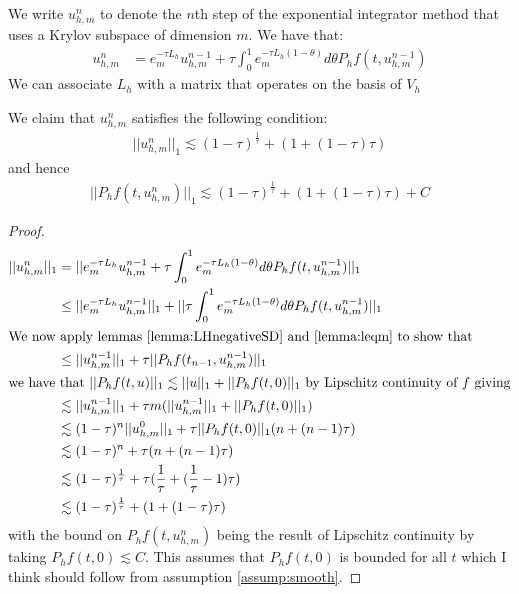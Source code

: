 \begin{definition}
    We write $u_{h,m}^n$ to denote the $n$th step of the exponential integrator method that uses a Krylov subspace of dimension $m$.
    We have that:
    \begin{align*}
        u_{h,m}^n &= e_m^{-\tau L_h} u_{h,m}^{n-1} + \tau \int^1_0e_m^{-\tau L_h(1-\theta)}d\theta P_hf(t, u_{h,m}^{n-1})
    \end{align*}
    We can associate $L_h$ with a matrix that operates on the basis of $V_h$
\end{definition}

\begin{lemma}
    We claim that $u_{h,m}^n$ satisfies the following condition:
    \begin{align*}
        ||u_{h,m}^n||_1 \lesssim (1-\tau)^\frac{1}{\tau} + (1 + (1 - \tau)\tau)
    \end{align*}
    and hence
    \begin{align*}
        ||P_hf(t,u_{h,m}^n)||_1 \lesssim (1-\tau)^\frac{1}{\tau} + (1 + (1 - \tau)\tau ) + C
    \end{align*}
\end{lemma}
\begin{proof}
    \begin{align*}
        ||u_{h,m}^n||_1 &= ||e_m^{-\tau L_h}u_{h,m}^{n-1} + \tau \int^1_0e_m^{-\tau L_h(1-\theta)}d\theta P_hf(t, u_{h,m}^{n-1})||_1\\
        &\leq ||e_m^{-\tau L_h}u_{h,m}^{n-1}||_1 + ||\tau \int^1_0e_m^{-\tau L_h(1-\theta)}d\theta P_hf(t, u_{h,m}^{n-1})||_1\\
        \intertext{We now apply lemmas \ref{lemma:LHnegativeSD} and \ref{lemma:leqm} to show that}
        &\leq ||u_{h,m}^{n-1}||_1 + \tau ||P_hf(t_{n-1},u_{h,m}^{n-1})||_1\\
        \intertext{we have that $||P_hf(t,u)||_1 \lesssim ||u||_1+||P_hf(t,0)||_1$ by Lipschitz continuity of $f$ giving}
        &\lesssim ||u_{h,m}^{n-1}||_1 + \tau m (||u_{h,m}^{n-1}||_1 + ||P_hf(t,0)||_1)\\
        &\lesssim (1-\tau)^n||u_{h,m}^0||_1 + \tau ||P_hf(t,0)||_1(n + (n -1)\tau)\\
        &\lesssim (1-\tau)^n + \tau (n + (n -1)\tau)\\
        &\lesssim (1-\tau)^\frac{1}{\tau} + \tau (\frac{1}{\tau} + (\frac{1}{\tau} -1)\tau)\\
        &\lesssim (1-\tau)^\frac{1}{\tau} + (1 + (1 - \tau)\tau)
    \end{align*}
    with the bound on $P_hf(t,u_{h,m}^n)$ being the result of Lipschitz continuity by taking $P_hf(t,0)\lesssim C$.
    This assumes that $P_hf(t,0)$ is bounded for all $t$ which I think should follow from assumption \ref{assump:smooth}.
\end{proof}
